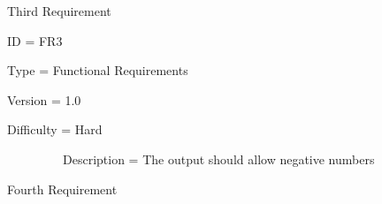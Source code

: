 \documentclass[12pt]{article}
\begin{document}
\begin{adjustwidth}{0.25in}{0.0in}
\begin{justify}
 Third Requirement
\end{justify}\par

\end{adjustwidth}



\begin{adjustwidth}{0.49in}{0.0in}
\begin{justify}
ID = FR3
\end{justify}\par

\end{adjustwidth}



\begin{adjustwidth}{0.49in}{0.0in}
\begin{justify}
Type = Functional Requirements
\end{justify}\par

\end{adjustwidth}



\begin{adjustwidth}{0.49in}{0.0in}
\begin{justify}
Version = 1.0
\end{justify}\par

\end{adjustwidth}



\begin{adjustwidth}{0.49in}{0.0in}
\begin{justify}
Difficulty = Hard
\end{justify}\par

\end{adjustwidth}



\ \ \ \ \ \ \ \ \ Description = The output should allow negative numbers\par



\begin{adjustwidth}{0.35in}{0.0in}
\begin{justify}
Fourth Requirement
\end{justify}\par

\end{adjustwidth}
\end{document}
